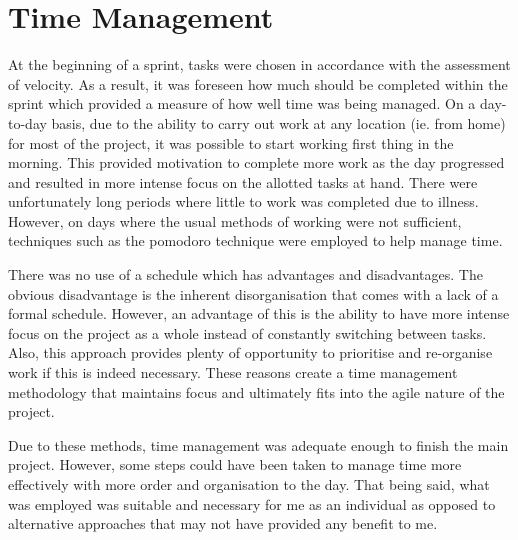 \section{Time Management}

At the beginning of a sprint, tasks were chosen in accordance with the assessment of velocity. As a result, it was foreseen how much should be completed within the sprint which provided a measure of how well time was being managed. On a day-to-day basis, due to the ability to carry out work at any location (ie. from home) for most of the project, it was possible to start working first thing in the morning. This provided motivation to complete more work as the day progressed and resulted in more intense focus on the allotted tasks at hand. There were unfortunately long periods where little to work was completed due to illness. However, on days where the usual methods of working were not sufficient, techniques such as the pomodoro technique\cite{pomodoro} were employed to help manage time.

There was no use of a schedule which has advantages and disadvantages. The obvious disadvantage is the inherent disorganisation that comes with a lack of a formal schedule. However, an advantage of this is the ability to have more intense focus on the project as a whole instead of constantly switching between tasks. Also, this approach provides plenty of opportunity to prioritise and re-organise work if this is indeed necessary. These reasons create a time management methodology that maintains focus and ultimately fits into the agile nature of the project.

Due to these methods, time management was adequate enough to finish the main project. However, some steps could have been taken to manage time more effectively with more order and organisation to the day. That being said, what was employed was suitable and necessary for me as an individual as opposed to alternative approaches that may not have provided any benefit to me.



